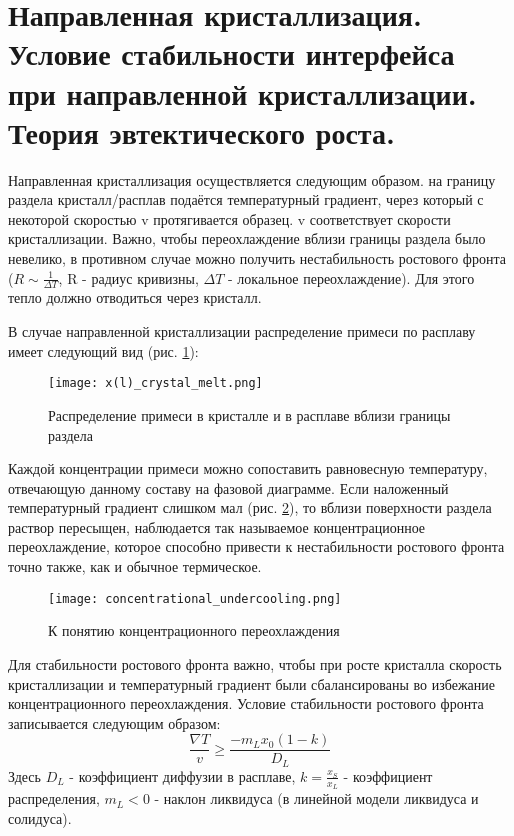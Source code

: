 \section{Направленная кристаллизация. Условие стабильности интерфейса при
направленной кристаллизации. Теория эвтектического роста.}
Направленная кристаллизация осуществляется следующим образом. на границу раздела кристалл/расплав подаётся температурный градиент, через который с некоторой скоростью v протягивается образец. v соответствует скорости кристаллизации. Важно, чтобы переохлаждение вблизи границы раздела было невелико, в противном случае можно получить нестабильность ростового фронта ($R\sim \frac{1}{\Delta T}$, R - радиус кривизны, $\Delta T$ - локальное переохлаждение). Для этого тепло должно отводиться через кристалл.
\par В случае направленной кристаллизации распределение примеси по расплаву имеет следующий вид (рис. \ref{fig:x(l)_crystal_melt}):
\begin{figure}[h!]
\centering
\centering
\texttt{[image: x(l)\_crystal\_melt.png]}\caption{Распределение примеси в кристалле и в расплаве вблизи границы раздела} \label{fig:x(l)_crystal_melt}
\end{figure}
\par  Каждой концентрации примеси можно сопоставить равновесную температуру, отвечающую данному составу на фазовой диаграмме. Если наложенный температурный градиент слишком мал (рис. \ref{fig:concentrational_undercooling}), то вблизи поверхности раздела раствор пересыщен, наблюдается так называемое концентрационное переохлаждение, которое способно привести к нестабильности ростового фронта точно также, как и обычное термическое. 
\begin{figure}[h!]
\centering
\centering
\texttt{[image: concentrational\_undercooling.png]}\caption{К понятию концентрационного переохлаждения} \label{fig:concentrational_undercooling}
\end{figure}
\par Для стабильности ростового фронта важно, чтобы при росте кристалла скорость кристаллизации и температурный градиент были сбалансированы во избежание концентрационного переохлаждения. Условие стабильности ростового фронта записывается следующим образом:
\begin{equation}
\frac{\nabla T}{v}\geq \frac{-m_Lx_0(1-k)}{D_L} 
\label{eq:growth_stability}  
\end{equation}
Здесь $D_L$ - коэффициент диффузии в расплаве, $k=\frac{x_S}{x_L}$ - коэффициент распределения, $m_L<0$ - наклон ликвидуса (в линейной модели ликвидуса и солидуса).
